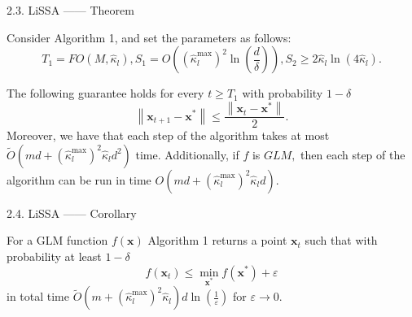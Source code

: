 \documentclass[pdf]{beamer}
\theoremstyle{remark}
\theoremstyle{definition}
\newcommand{\examplebox}[2]{
\begin{tcolorbox}[colframe=darkcardinal,colback=boxgray,title=#1]
#2
\end{tcolorbox}}
\begin{document}
\begin{frame}{2.3. LiSSA —— Theorem}
\examplebox{Theorem 3.3}{
\small
Consider Algorithm 1, and set the parameters as follows:
$$T_{1}=F O\left(M, \hat{\kappa}_{l}\right), S_{1}=O\left(\left(\hat{\kappa}_{l}^{\max }\right)^{2} \ln \left(\frac{d}{\delta}\right)\right), S_{2} \geq 2 \hat{\kappa}_{l} \ln \left(4 \hat{\kappa}_{l}\right).$$

The following guarantee holds for every $t \geq T_{1}$ with probability $1-\delta$
$$\left\|\mathbf{x}_{t+1}-\mathbf{x}^{*}\right\| \leq \frac{\left\|\mathbf{x}_{t}-\mathbf{x}^{*}\right\|}{2}.$$
Moreover, we have that each step of the algorithm takes at most $\tilde{O}\left(m d+\left(\hat{\kappa}_{l}^{\max }\right)^{2} \hat{\kappa}_{l} d^{2}\right)$ time. Additionally, if $f$ is $G L M,$ then each step of the algorithm can be run in time $O\left(m d+\left(\hat{\kappa}_{l}^{\max }\right)^{2} \hat{\kappa}_{l} d\right)$.

}





\end{frame}
\begin{frame}{2.4. LiSSA —— Corollary}
\examplebox{Corollary 3.4}{For a GLM function $f(\mathbf{x})$ Algorithm 1 returns a point $\mathbf{x}_{t}$ such that with probability at least $1 - \delta$
$$f\left(\mathbf{x}_{t}\right) \leq \min _{\mathbf{x}^{*}} f\left(\mathbf{x}^{*}\right)+\varepsilon$$
in total time $\tilde{O}\left(m+\left(\hat{\kappa}_{l}^{\max }\right)^{2} \hat{\kappa}_{l}\right) d \ln \left(\frac{1}{\varepsilon}\right)$ for $\varepsilon \rightarrow 0$.
}

\end{frame}
\end{document}
